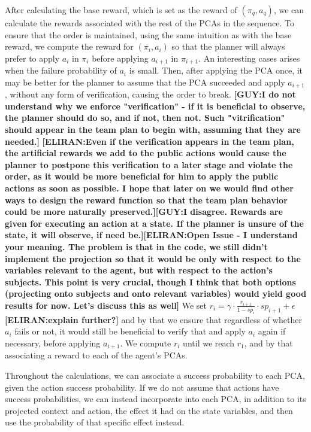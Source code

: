 \documentclass[letterpaper]{article} %
\newcommand{\eliran}[1]{\textbf{[\color{red}ELIRAN:#1]}}
\newcommand{\guy}[1]{\textbf{[\color{orange}GUY:#1]}}
\begin{document}
After calculating the base reward, which is set as the reward of $(\pi_q, a_q)$, we can calculate the rewards associated with the rest of the PCAs in the sequence. To ensure that the order is maintained, using the same intuition as with the base reward, we compute the reward for $(\pi_i, a_i)$ so that the planner will always prefer to apply $a_i$ in $\pi_i$ before applying $a_{i+1}$ in $\pi_{i+1}$. 
An interesting cases arises when the failure probability of $a_i$ is small. Then, after applying the PCA once, it may be better for the planner to assume that the PCA succeeded and apply $a_{i+1}$, without any form of verification, causing the order to break.
\guy{I do not understand why we enforce "verification" - if it is beneficial to observe, the planner should do so, and if not, then not. Such "vitrification" should appear in the team plan to begin with, assuming that they are needed.}
\eliran{Even if the verification appears in the team plan, the artificial rewards we add to the public actions would cause the planner to postpone this verification to a later stage and violate the order, as it would be more beneficial for him to apply the public actions as soon as possible. I hope that later on we would find other ways to design the reward function so that the team plan behavior could be more naturally preserved.}\guy{I disagree. Rewards are given for executing an action at a state. If the planner is unsure of the state, it will observe, if need be.}\eliran{Open Issue - I understand your meaning. The problem is that in the code, we still didn't implement the projection so that it would be only with respect to the variables relevant to the agent, but with respect to the action's subjects. This point is very crucial, though I think that both options (projecting onto subjects and onto relevant variables) would yield good results for now. Let's discuss this as well}
We set $r_i=\gamma \cdot \frac{r_{i+1}}{1-sp_i} \cdot sp_{i+1} + \epsilon$ \eliran{explain further?}
and by that we ensure that regardless of whether $a_i$ fails or not, it would still be beneficial to verify that and apply $a_i$ again if necessary, before applying $a_{i+1}$. We compute $r_i$ until we reach $r_1$, and by that associating a reward to each of the agent's PCAs.

Throughout the calculations, we can associate a success probability to each PCA, given the action success probability. If we do not assume that actions have success probabilities, we can instead incorporate into each PCA, in addition to its projected context and action, the effect it had on the state variables, and then use the probability of that specific effect instead.
\end{document}
